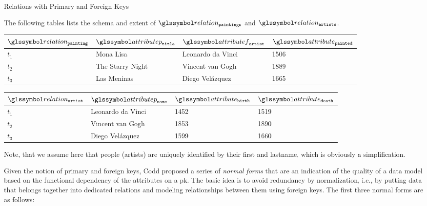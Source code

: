 \begin{example}[label=example:relational_table_pkfk]{Relations with Primary and Foreign Keys}{}
    
    The following tables lists the schema and extent of $\relation_{\mathtt{paintings}}$ and $\relation_{\mathtt{artists}}$.
    \begin{center}
        \begin{tabular}{ l || l | l | l |}
            $\relation_{\mathtt{painting}}$ & $\attributep_{\mathtt{title}}$  & $\attributef_{\mathtt{artist}}$  & $\attribute_{\mathtt{painted}}$ \\ 
            \hline
            \hline
            $t_1$ & Mona Lisa &  Leonardo da Vinci & 1506 \\
            \hline
            $t_2$ & The Starry Night & Vincent van Gogh & 1889 \\
            \hline
            $t_3$ & Las Meninas & Diego Velázquez & 1665 \\
            \hline
        \end{tabular}
    \end{center}

    \begin{center}
        \begin{tabular}{ l || l | l | l |}
            $\relation_{\mathtt{artist}}$ & $\attributep_{\mathtt{name}}$ & $\attribute_{\mathtt{birth}}$ & $\attribute_{\mathtt{death}}$\\ 
            \hline
            \hline
            $t_1$ & Leonardo da Vinci & 1452 & 1519 \\
            \hline
            $t_2$ & Vincent van Gogh & 1853 & 1890 \\
            \hline
            $t_3$ & Diego Velázquez & 1599 & 1660 \\
            \hline
        \end{tabular}
    \end{center}

    Note, that we assume here that people (artists) are uniquely identified by their first and lastname, which is obviously a simplification.
\end{example}

Given the notion of primary and foreign keys, Codd proposed a series of \emph{normal forms} that are an indication of the quality of a data model based on the functional dependency of the attributes on a \acrshort{pk}. The basic idea is to avoid redundancy by normalization, i.e., by putting data that belongs together into dedicated relations and modeling relationships between them using foreign keys. The first three normal forms are as follows:

